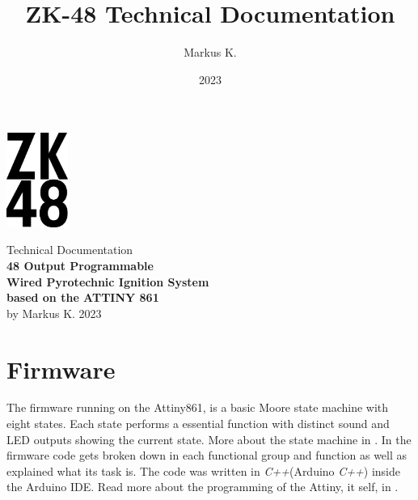 

\title{ZK-48 Technical Documentation}
\author{Markus K.}
\date{2023}

%



\begin{titlepage}
\begin{center}
\vspace*{1cm}
\includegraphics[width=2cm]{./Figures/zk_48_logo.png}
\vspace*{1cm}

\Huge {Technical Documentation\\} 
\vspace*{1cm}
\Huge{\textbf{48 Output Programmable\\ Wired Pyrotechnic Ignition System\\ based on the ATTINY 861\\}}
\vspace*{0.5cm} 
\Large{by Markus K.}
\vspace*{0.5cm}
\Large{2023}

\end{center}
\end{titlepage}

\pagebreak 

\tableofcontents

\pagebreak



%



\section{Firmware}
\label{Firmware}
The firmware running on the Attiny861, is a basic Moore state machine with eight states. Each state performs a essential function  with distinct sound and LED outputs showing the current state. More about the state machine in . In  the firmware code gets broken down in each functional group and function as well as explained what its task is. The code was written in \textit{C++}(Arduino \textit{C++}) inside the Arduino IDE. Read more about the programming of the Attiny, it self, in .

